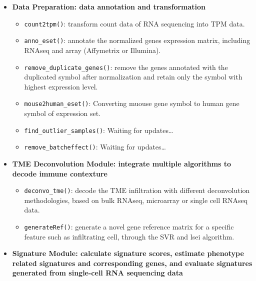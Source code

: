 \documentclass[
  12pt,
]{book}
\providecommand{\tightlist}{%
  \setlength{\itemsep}{0pt}\setlength{\parskip}{0pt}}
\begin{document}
\begin{itemize}
\item
  \textbf{Data Preparation: data annotation and transformation}

  \begin{itemize}
  \tightlist
  \item
    \texttt{count2tpm()}: transform count data of RNA sequencing into TPM data.
  \item
    \texttt{anno\_eset()}: annotate the normalized genes expression matrix, including RNAseq and array (Affymetrix or Illumina).
  \item
    \texttt{remove\_duplicate\_genes()}: remove the genes annotated with the duplicated symbol after normalization and retain only the symbol with highest expression level.
  \item
    \texttt{mouse2human\_eset()}: Converting muouse gene symbol to human gene symbol of expression set.
  \item
    \texttt{find\_outlier\_samples()}: Waiting for updates\ldots{}
  \item
    \texttt{remove\_batcheffect()}: Waiting for updates\ldots{}
  \end{itemize}
\item
  \textbf{TME Deconvolution Module: integrate multiple algorithms to decode immune contexture}

  \begin{itemize}
  \tightlist
  \item
    \texttt{deconvo\_tme()}: decode the TME infiltration with different deconvolution methodologies, based on bulk RNAseq, microarray or single cell RNAseq data.
  \item
    \texttt{generateRef()}: generate a novel gene reference matrix for a specific feature such as infiltrating cell, through the SVR and lsei algorithm.
  \end{itemize}
\item
  \textbf{Signature Module: calculate signature scores, estimate phenotype related signatures and corresponding genes, and evaluate signatures generated from single-cell RNA sequencing data }


\end{itemize}
\end{document}

